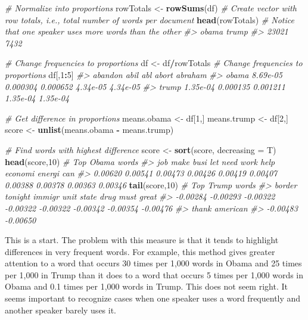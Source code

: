 \documentclass[]{book}
\newenvironment{Shaded}{\begin{snugshade}}{\end{snugshade}}
\newcommand{\KeywordTok}[1]{\textcolor[rgb]{0.13,0.29,0.53}{\textbf{#1}}}
\newcommand{\DataTypeTok}[1]{\textcolor[rgb]{0.13,0.29,0.53}{#1}}
\newcommand{\DecValTok}[1]{\textcolor[rgb]{0.00,0.00,0.81}{#1}}
\newcommand{\StringTok}[1]{\textcolor[rgb]{0.31,0.60,0.02}{#1}}
\newcommand{\CommentTok}[1]{\textcolor[rgb]{0.56,0.35,0.01}{\textit{#1}}}
\newcommand{\OperatorTok}[1]{\textcolor[rgb]{0.81,0.36,0.00}{\textbf{#1}}}
\newcommand{\NormalTok}[1]{#1}
\begin{document}
\begin{Shaded}
\begin{Highlighting}[]
\CommentTok{# Normalize into proportions}
\NormalTok{rowTotals <-}\StringTok{ }\KeywordTok{rowSums}\NormalTok{(df) }\CommentTok{# Create vector with row totals, i.e., total number of words per document}
\KeywordTok{head}\NormalTok{(rowTotals) }\CommentTok{# Notice that one speaker uses more words than the other}
\CommentTok{#> obama trump }
\CommentTok{#> 23021  7432}

\CommentTok{# Change frequencies to proportions}
\NormalTok{df <-}\StringTok{ }\NormalTok{df}\OperatorTok{/}\NormalTok{rowTotals }\CommentTok{# Change frequencies to proportions}
\NormalTok{df[,}\DecValTok{1}\OperatorTok{:}\DecValTok{5}\NormalTok{]}
\CommentTok{#>        abandon     abil      abl    abort  abraham}
\CommentTok{#> obama 8.69e-05 0.000304 0.000652 4.34e-05 4.34e-05}
\CommentTok{#> trump 1.35e-04 0.000135 0.001211 1.35e-04 1.35e-04}

\CommentTok{# Get difference in proportions}
\NormalTok{means.obama <-}\StringTok{ }\NormalTok{df[}\DecValTok{1}\NormalTok{,]}
\NormalTok{means.trump <-}\StringTok{ }\NormalTok{df[}\DecValTok{2}\NormalTok{,]}
\NormalTok{score <-}\StringTok{ }\KeywordTok{unlist}\NormalTok{(means.obama }\OperatorTok{-}\StringTok{ }\NormalTok{means.trump)}

\CommentTok{# Find words with highest difference}
\NormalTok{score <-}\StringTok{ }\KeywordTok{sort}\NormalTok{(score, }\DataTypeTok{decreasing =}\NormalTok{ T)}
\KeywordTok{head}\NormalTok{(score,}\DecValTok{10}\NormalTok{) }\CommentTok{# Top Obama words}
\CommentTok{#>     job    make    busi     let    need    work    help economi  energi     can }
\CommentTok{#> 0.00620 0.00541 0.00473 0.00426 0.00419 0.00407 0.00388 0.00378 0.00363 0.00346}
\KeywordTok{tail}\NormalTok{(score,}\DecValTok{10}\NormalTok{) }\CommentTok{# Top Trump words}
\CommentTok{#>   border  tonight   immigr     unit    state     drug     must    great }
\CommentTok{#> -0.00284 -0.00293 -0.00322 -0.00322 -0.00322 -0.00342 -0.00354 -0.00476 }
\CommentTok{#>    thank american }
\CommentTok{#> -0.00483 -0.00650}
\end{Highlighting}
\end{Shaded}

This is a start. The problem with this measure is that it tends to
highlight differences in very frequent words. For example, this method
gives greater attention to a word that occurs 30 times per 1,000 words
in Obama and 25 times per 1,000 in Trump than it does to a word that
occurs 5 times per 1,000 words in Obama and 0.1 times per 1,000 words in
Trump. This does not seem right. It seems important to recognize cases
when one speaker uses a word frequently and another speaker barely uses
it.
\end{document}
